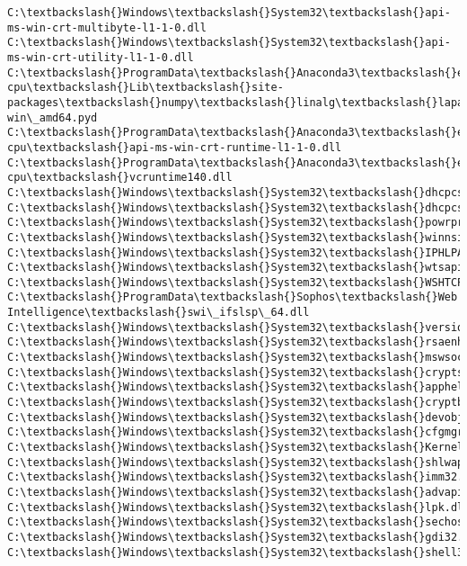 \documentclass[11pt]{article}
\begin{document}
\begin{Verbatim}[commandchars=\\\{\}]
C:\textbackslash{}Windows\textbackslash{}System32\textbackslash{}api-ms-win-crt-multibyte-l1-1-0.dll
C:\textbackslash{}Windows\textbackslash{}System32\textbackslash{}api-ms-win-crt-utility-l1-1-0.dll
C:\textbackslash{}ProgramData\textbackslash{}Anaconda3\textbackslash{}envs\textbackslash{}fastai-cpu\textbackslash{}Lib\textbackslash{}site-packages\textbackslash{}numpy\textbackslash{}linalg\textbackslash{}lapack\_lite.cp36-win\_amd64.pyd
C:\textbackslash{}ProgramData\textbackslash{}Anaconda3\textbackslash{}envs\textbackslash{}fastai-cpu\textbackslash{}api-ms-win-crt-runtime-l1-1-0.dll
C:\textbackslash{}ProgramData\textbackslash{}Anaconda3\textbackslash{}envs\textbackslash{}fastai-cpu\textbackslash{}vcruntime140.dll
C:\textbackslash{}Windows\textbackslash{}System32\textbackslash{}dhcpcsvc.dll
C:\textbackslash{}Windows\textbackslash{}System32\textbackslash{}dhcpcsvc6.dll
C:\textbackslash{}Windows\textbackslash{}System32\textbackslash{}powrprof.dll
C:\textbackslash{}Windows\textbackslash{}System32\textbackslash{}winnsi.dll
C:\textbackslash{}Windows\textbackslash{}System32\textbackslash{}IPHLPAPI.DLL
C:\textbackslash{}Windows\textbackslash{}System32\textbackslash{}wtsapi32.dll
C:\textbackslash{}Windows\textbackslash{}System32\textbackslash{}WSHTCPIP.DLL
C:\textbackslash{}ProgramData\textbackslash{}Sophos\textbackslash{}Web Intelligence\textbackslash{}swi\_ifslsp\_64.dll
C:\textbackslash{}Windows\textbackslash{}System32\textbackslash{}version.dll
C:\textbackslash{}Windows\textbackslash{}System32\textbackslash{}rsaenh.dll
C:\textbackslash{}Windows\textbackslash{}System32\textbackslash{}mswsock.dll
C:\textbackslash{}Windows\textbackslash{}System32\textbackslash{}cryptsp.dll
C:\textbackslash{}Windows\textbackslash{}System32\textbackslash{}apphelp.dll
C:\textbackslash{}Windows\textbackslash{}System32\textbackslash{}cryptbase.dll
C:\textbackslash{}Windows\textbackslash{}System32\textbackslash{}devobj.dll
C:\textbackslash{}Windows\textbackslash{}System32\textbackslash{}cfgmgr32.dll
C:\textbackslash{}Windows\textbackslash{}System32\textbackslash{}KernelBase.dll
C:\textbackslash{}Windows\textbackslash{}System32\textbackslash{}shlwapi.dll
C:\textbackslash{}Windows\textbackslash{}System32\textbackslash{}imm32.dll
C:\textbackslash{}Windows\textbackslash{}System32\textbackslash{}advapi32.dll
C:\textbackslash{}Windows\textbackslash{}System32\textbackslash{}lpk.dll
C:\textbackslash{}Windows\textbackslash{}System32\textbackslash{}sechost.dll
C:\textbackslash{}Windows\textbackslash{}System32\textbackslash{}gdi32.dll
C:\textbackslash{}Windows\textbackslash{}System32\textbackslash{}shell32.dll

\end{Verbatim}
\end{document}
